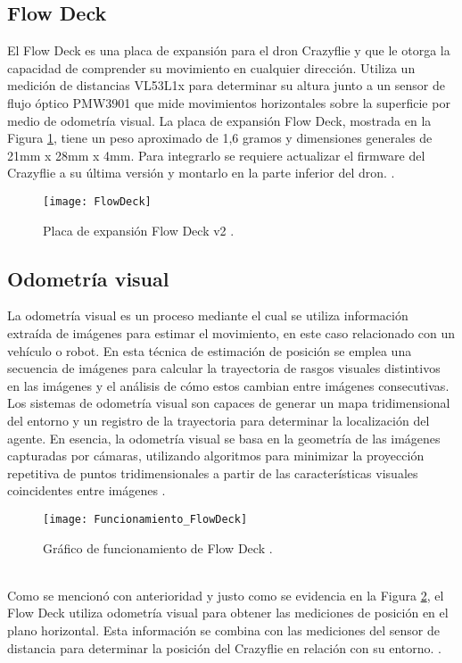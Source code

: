 \subsection*{Flow Deck}
El Flow Deck es una placa de expansión para el dron Crazyflie y que le otorga la capacidad de comprender su movimiento en cualquier dirección. Utiliza un medición de distancias VL53L1x para determinar su altura junto a un sensor de flujo óptico PMW3901 que mide movimientos horizontales sobre la superficie por medio de odometría visual.  La placa de expansión Flow Deck, mostrada en la Figura \ref{fig:FlowDeck}, tiene un peso aproximado de 1,6 gramos y dimensiones generales de 21mm x 28mm x 4mm. Para integrarlo se requiere actualizar el firmware del Crazyflie a su última versión y montarlo en la parte inferior del dron. \cite{FlowDeck}. 
\begin{figure}[htbp]
	\centering
	\texttt{[image: FlowDeck]}
	\caption{Placa de expansión Flow Deck v2 \cite{FlowDeck}.}
	\label{fig:FlowDeck}
\end{figure}
\subsection*{Odometría visual}
La odometría visual es un proceso mediante el cual se utiliza información extraída de imágenes para estimar el movimiento, en este caso relacionado con un vehículo o robot. En esta técnica de estimación de posición se emplea una secuencia de imágenes para calcular la trayectoria de rasgos visuales distintivos en las imágenes y el análisis de cómo estos cambian entre imágenes consecutivas. Los sistemas de odometría visual son capaces de generar un mapa tridimensional del entorno y un registro de la trayectoria para determinar la localización del agente. En esencia, la odometría visual se basa en la geometría de las imágenes capturadas por cámaras, utilizando algoritmos para minimizar la proyección repetitiva de puntos tridimensionales a partir de las características visuales coincidentes entre imágenes \cite{Persson2022_book}. 
\begin{figure}[htbp]
	\centering
	\texttt{[image: Funcionamiento\_FlowDeck]}
	\caption{Gráfico de funcionamiento de Flow Deck \cite{Funcionamiento_FlowDeck}.}
	\label{fig:Funcionamiento_FlowDeck}
\end{figure}
\\Como se mencionó con anterioridad y justo como se evidencia en la Figura \ref{fig:Funcionamiento_FlowDeck}, el Flow Deck utiliza odometría visual para obtener las mediciones de posición en el plano horizontal. Esta información se combina con las mediciones del sensor de distancia para determinar la posición del Crazyflie en relación con su entorno. \cite{Funcionamiento_FlowDeck}.

